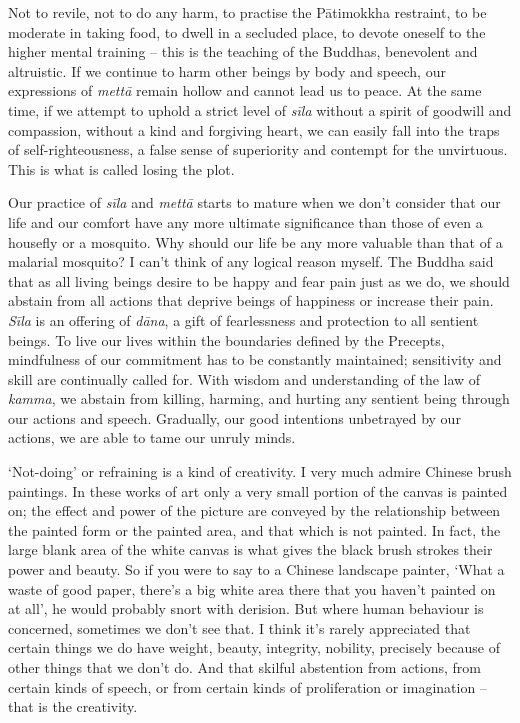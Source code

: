 Not to revile, not to do any harm, to practise the Pātimokkha restraint,
to be moderate in taking food, to dwell in a secluded place, to devote
oneself to the higher mental training -- this is the teaching of the
Buddhas, benevolent and altruistic. If we continue to harm other beings
by body and speech, our expressions of \emph{mettā} remain hollow and
cannot lead us to peace. At the same time, if we attempt to uphold a
strict level of \emph{sīla} without a spirit of goodwill and compassion,
without a kind and forgiving heart, we can easily fall into the traps of
self-righteousness, a false sense of superiority and contempt for the
unvirtuous. This is what is called losing the plot.

Our practice of \emph{sīla} and \emph{mettā} starts to mature when we
don't consider that our life and our comfort have any more ultimate
significance than those of even a housefly or a mosquito. Why should our
life be any more valuable than that of a malarial mosquito? I can't
think of any logical reason myself. The Buddha said that as all living
beings desire to be happy and fear pain just as we do, we should abstain
from all actions that deprive beings of happiness or increase their
pain. \emph{Sīla} is an offering of \emph{dāna}, a gift of fearlessness
and protection to all sentient beings. To live our lives within the
boundaries defined by the Precepts, mindfulness of our commitment has to
be constantly maintained; sensitivity and skill are continually called
for. With wisdom and understanding of the law of \emph{kamma}, we
abstain from killing, harming, and hurting any sentient being through
our actions and speech. Gradually, our good intentions unbetrayed by our
actions, we are able to tame our unruly minds.

`Not-doing' or refraining is a kind of creativity. I very much admire
Chinese brush paintings. In these works of art only a very small portion
of the canvas is painted on; the effect and power of the picture are
conveyed by the relationship between the painted form or the painted
area, and that which is not painted. In fact, the large blank area of
the white canvas is what gives the black brush strokes their power and
beauty. So if you were to say to a Chinese landscape painter, `What a
waste of good paper, there's a big white area there that you haven't
painted on at all', he would probably snort with derision. But where
human behaviour is concerned, sometimes we don't see that. I think it's
rarely appreciated that certain things we do have weight, beauty,
integrity, nobility, precisely because of other things that we don't do.
And that skilful abstention from actions, from certain kinds of speech,
or from certain kinds of proliferation or imagination -- that is the
creativity.

